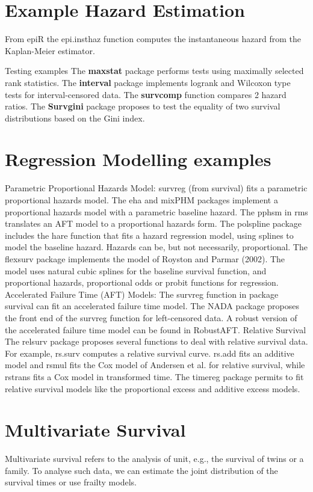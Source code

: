 \documentclass[11pt]{article} %
\begin{document}
\section{Example Hazard Estimation}
From epiR the epi.insthaz function computes the instantaneous hazard from the Kaplan-Meier estimator. 

Testing examples
The \textbf{maxstat} package performs tests using maximally selected rank statistics. 
The \textbf{interval} package implements logrank and Wilcoxon type tests for interval-censored data. 
The \textbf{survcomp} function compares 2 hazard ratios. 
The \textbf{Survgini} package proposes to test the equality of two survival distributions based on the Gini index. 
\section{Regression Modelling examples}
Parametric Proportional Hazards Model: survreg (from survival) fits a parametric proportional hazards model. The eha and mixPHM packages implement a proportional hazards model with a parametric baseline hazard. The pphsm in rms translates an AFT model to a proportional hazards form. The polspline package includes the hare function that fits a hazard regression model, using splines to model the baseline hazard. Hazards can be, but not necessarily, proportional. The flexsurv package implements the model of Royston and Parmar (2002). The model uses natural cubic splines for the baseline survival function, and proportional hazards, proportional odds or probit functions for regression. 
Accelerated Failure Time (AFT) Models: The survreg function in package survival can fit an accelerated failure time model. The NADA package proposes the front end of the survreg function for left-censored data. A robust version of the accelerated failure time model can be found in RobustAFT. 
Relative Survival 
The relsurv package proposes several functions to deal with relative survival data. For example, rs.surv computes a relative survival curve. rs.add fits an additive model and rsmul fits the Cox model of Andersen et al. for relative survival, while rstrans fits a Cox model in transformed time. 
The timereg package permits to fit relative survival models like the proportional excess and additive excess models. 

\section{Multivariate Survival}
Multivariate survival refers to the analysis of unit, e.g., the survival of twins or a family. To analyse such data, we can estimate the joint distribution of the survival times or use frailty models. 
\end{document}
